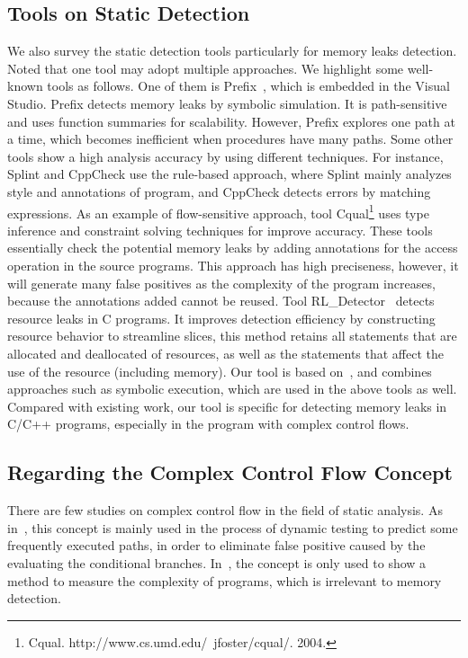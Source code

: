 \subsection{Tools on Static Detection}
We also survey the static detection tools particularly for memory leaks detection. Noted that one tool may adopt multiple approaches. We highlight some well-known tools as follows. One of them is Prefix~\cite{BPS00}, which is embedded in the Visual Studio. Prefix detects memory leaks by symbolic simulation. It is path-sensitive and uses function summaries for scalability. However, Prefix explores one path at a time, which becomes inefficient when procedures have many paths. %
Some other tools show a high analysis accuracy by using different techniques. For instance, Splint and CppCheck use the rule-based approach, where Splint mainly analyzes style and annotations of program, and CppCheck detects errors by matching expressions. As an example of flow-sensitive approach, tool Cqual\footnote{Cqual. http://www.cs.umd.edu/~jfoster/cqual/. 2004.} uses type inference and constraint solving techniques for improve accuracy. These tools essentially check the potential memory leaks by adding annotations for the access operation in the source programs. This approach has high preciseness, however, it will generate many false positives as the complexity of the program increases, because the annotations added cannot be reused. Tool RL\_Detector~\cite{J14} detects resource leaks in C programs. It improves detection efficiency by constructing resource behavior to streamline slices, this method retains all statements that are allocated and deallocated of resources, as well as the statements that affect the use of the resource (including memory). Our tool is based on~\cite{XA05,YZ04}, and combines approaches such as symbolic execution, which are used in the above tools as well. Compared with existing work, our tool is specific for detecting memory leaks in C/C++ programs, especially in the program with complex control flows. 

\subsection{Regarding the Complex Control Flow Concept}
There are few studies on complex control flow in the field of static analysis. As in~\cite{KJMP06}, this concept is mainly used in the process of dynamic testing to predict some frequently executed paths, in order to eliminate false positive caused by the evaluating the conditional branches. In~\cite{KK12}, the concept is only used to show a method to measure the complexity of programs, which is irrelevant to memory detection. %


